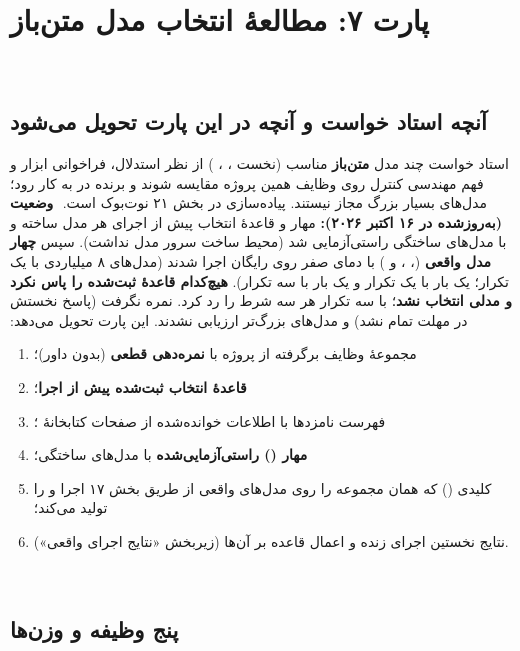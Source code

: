 ‫\documentclass[a4paper,12pt]{article}
\begin{document}
‫
‫\section{پارت ۷: مطالعهٔ انتخاب مدل  متن‌باز}
‫
‫\subsection{آنچه استاد خواست و آنچه در این پارت تحویل می‌شود}
‫استاد خواست چند مدل \textbf{متن‌باز} مناسب (نخست ، ، ) از نظر استدلال، فراخوانی ابزار و فهم مهندسی کنترل روی وظایف همین پروژه مقایسه شوند و برنده در  به کار رود؛ مدل‌های بسیار بزرگ مجاز نیستند. پیاده‌سازی در بخش ۲۱ نوت‌بوک است.
‫
‫\textbf{وضعیت (به‌روزشده در ۱۶ اکتبر ۲۰۲۶):} مهار و قاعدهٔ انتخاب پیش از اجرای هر مدل ساخته و با مدل‌های ساختگی راستی‌آزمایی شد (محیط ساخت سرور مدل نداشت). سپس \textbf{چهار مدل واقعی} (، ،  و ) با دمای صفر روی  رایگان  اجرا شدند (مدل‌های ۸ میلیاردی با یک تکرار؛  یک بار با یک تکرار و یک بار با سه تکرار). \textbf{هیچ‌کدام قاعدهٔ ثبت‌شده را پاس نکرد و مدلی انتخاب نشد}؛  با سه تکرار هر سه شرط را رد کرد.  نمره نگرفت (پاسخ نخستش در مهلت تمام نشد) و مدل‌های بزرگ‌تر ارزیابی نشدند. این پارت تحویل می‌دهد:
‫\begin{enumerate}
‫\item مجموعهٔ وظایف برگرفته از پروژه با \textbf{نمره‌دهی قطعی} (بدون  داور)؛
‫\item \textbf{قاعدهٔ انتخاب ثبت‌شده پیش از اجرا}؛
‫\item فهرست نامزدها با اطلاعات خوانده‌شده از صفحات کتابخانهٔ ؛
‫\item \textbf{مهار () راستی‌آزمایی‌شده} با مدل‌های ساختگی؛
‫\item کلیدی (\texttt{}) که همان مجموعه را روی مدل‌های واقعی از طریق \texttt{} بخش ۱۷ اجرا و \texttt{} را تولید می‌کند؛
‫\item نتایج نخستین اجرای زنده و اعمال قاعده بر آن‌ها (زیربخش «نتایج اجرای واقعی»).
‫\end{enumerate}
‫
‫\subsection{پنج وظیفه و وزن‌ها}
\end{document}
